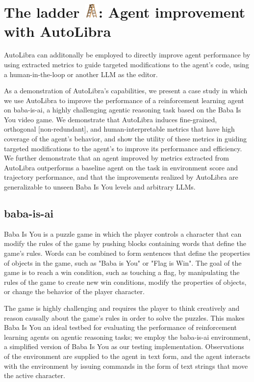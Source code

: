 \section{The ladder \protect\includegraphics[height=1em]{figs/ladder.png}: Agent improvement with AutoLibra}

AutoLibra can additonally be employed to directly improve agent performance by using extracted metrics to guide targeted modifications to the agent's code, using a human-in-the-loop or another LLM as the editor.

As a demonstration of AutoLibra's capabilities, we present a case study in which we use AutoLibra to improve the performance of a reinforcement learning agent on baba-is-ai, a highly challenging agentic reasoning task based on the Baba Is You video game. We demonstrate that AutoLibra induces fine-grained, orthogonal [non-redundant], and human-interpretable metrics that have high coverage of the agent's behavior, and show the utility of these metrics in guiding targeted modifications to the agent's to improve its performance and efficiency. We further demonstrate that an agent improved by metrics extracted from AutoLibra outperforms a baseline agent on the task in environment score and trajectory performance, and that the improvements realized by AutoLibra are generalizable to unseen Baba Is You levels and arbitrary LLMs.

\subsection{baba-is-ai}
Baba Is You is a puzzle game in which the player controls a character that can modify the rules of the game by pushing blocks containing words that define the game's rules. Words can be combined to form sentences that define the properties of objects in the game, such as "Baba is You" or "Flag is Win". The goal of the game is to reach a win condition, such as touching a flag, by manipulating the rules of the game to create new win conditions, modify the properties of objects, or change the behavior of the player character.

The game is highly challenging and requires the player to think creatively and reason causally about the game's rules in order to solve the puzzles. This makes Baba Is You an ideal testbed for evaluating the performance of reinforcement learning agents on agentic reasoning tasks; we employ the baba-is-ai environment, a simplified version of Baba Is You \cite{cloos2024babaaibreakrules, paglieri2024balrog} as our testing implementation. Observations of the environment are supplied to the agent in text form, and the agent interacts with the environment by issuing commands in the form of text strings that move the active character.

